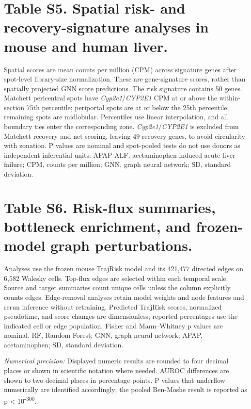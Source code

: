 \section*{Table S5. Spatial risk- and recovery-signature analyses in mouse and human liver.}
\label{tab:S5}
\noindent Spatial scores are mean counts per million (CPM) across signature genes after spot-level library-size normalization. These are gene-signature scores, rather than spatially projected GNN score predictions. The risk signature contains 50 genes. Matchett pericentral spots have \textit{Cyp2e1}/\allowbreak{}\textit{CYP2E1} CPM at or above the within-section 75th percentile; periportal spots are at or below the 25th percentile; remaining spots are midlobular. Percentiles use linear interpolation, and all boundary ties enter the corresponding zone. \textit{Cyp2e1}/\allowbreak{}\textit{CYP2E1} is excluded from Matchett recovery and net scoring, leaving 49 recovery genes, to avoid circularity with zonation. P values are nominal and spot-pooled tests do not use donors as independent inferential units. APAP-ALF, acetaminophen-induced acute liver failure; CPM, counts per million; GNN, graph neural network; SD, standard deviation.


\clearpage

\clearpage

\clearpage

\clearpage
\section*{Table S6. Risk-flux summaries, bottleneck enrichment, and frozen-model graph perturbations.}
\label{tab:S6}
\noindent Analyses use the frozen mouse TrajRisk model and its 421,477 directed edges on 6,582 Walesky cells. Top-flux edges are selected within each temporal scale. Source and target summaries count unique cells unless the column explicitly counts edges. Edge-removal analyses retain model weights and node features and rerun inference without retraining. Predicted TrajRisk scores, normalized pseudotime, and score changes are dimensionless; reported percentages use the indicated cell or edge population. Fisher and Mann--Whitney p values are nominal. RF, Random Forest; GNN, graph neural network; APAP, acetaminophen; SD, standard deviation.


\clearpage

\clearpage

\clearpage

\clearpage

\clearpage

\clearpage

\par\medskip\noindent\textit{Numerical precision:} Displayed numeric results are rounded to four decimal places or shown in scientific notation where needed. AUROC differences are shown to two decimal places in percentage points. P values that underflow numerically are identified accordingly; the pooled Ben-Moshe result is reported as p < 10\textsuperscript{-300}.
